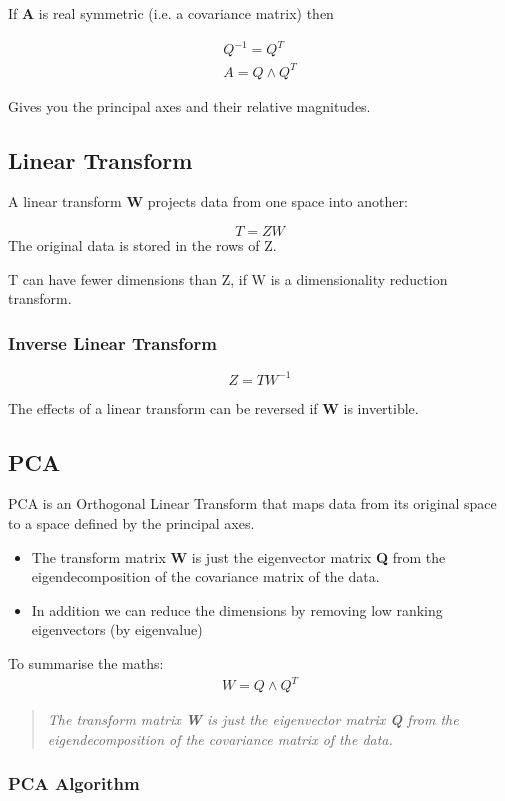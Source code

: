 If \textbf{A} is real symmetric (i.e. a covariance matrix) then 

\begin{align}
    Q^{-1} = Q^{T} \\
    A = Q \land Q^{T}
\end{align}

Gives you the principal axes and their relative magnitudes.

\subsection{Linear Transform}
A linear transform \textbf{W} projects data from one space into another:

\begin{equation}
    T = ZW
\end{equation}
The original data is stored in the rows of Z.

T can have fewer dimensions than Z, if W is a dimensionality reduction transform.

\subsubsection{Inverse Linear Transform}

\begin{equation}
    Z = TW^{-1}
\end{equation}

The effects of a linear transform can be reversed if \textbf{W} is invertible.

\subsection{PCA}
PCA is an Orthogonal Linear Transform that maps data from its original space to a space defined by the principal axes.
\begin{itemize}
    \item The transform matrix \textbf{W} is just the eigenvector matrix \textbf{Q} from the eigendecomposition of the covariance matrix of the data.
    \item In addition we can reduce the dimensions by removing low ranking eigenvectors (by eigenvalue)
\end{itemize}

To summarise the maths:
\begin{align}
    W = Q \land Q^{T}
\end{align}

\begin{quote}
    \textit{The transform matrix \textbf{W} is just the eigenvector matrix \textbf{Q} from the eigendecomposition of the covariance matrix of the data.}
\end{quote}

\subsubsection{PCA Algorithm}